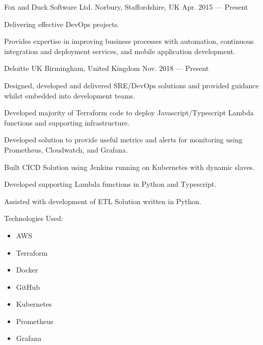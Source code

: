 

\begin{cventries}

	{Fox and Duck Software Ltd.} %
	{Norbury, Staffordshire, UK} %
	{Apr. 2015 — Present} %
	{
		\begin{cvitems} %
		\item {Delivering effective DevOps projects.}
		\item {Provides expertise in improving business processes with automation, continuous integration and deployment services, and mobile application development.}
		\end{cvitems}
	}

	{Deloitte UK}
	{Birmingham, United Kingdom}
	{Nov. 2018 — Present}
	{
		\begin{cvitems}
			\item{Designed, developed and delivered SRE/DevOps solutions and provided guidance whilst embedded into development teams.}
			\item{Developed majority of Terraform code to deploy Javascript/Typescript Lambda functions and supporting infrastructure.}
			\item{Developed solution to provide useful metrics and alerts for monitoring using Prometheus, Cloudwatch, and Grafana.}
			\item{Built CICD Solution using Jenkins running on Kubernetes with dynamic slaves.}
			\item{Developed supporting Lambda functions in Python and Typescript.}
			\item{Assisted with development of ETL Solution written in Python.}
			\item{Technologies Used:}
				\begin{itemize}
					\item AWS
					\item Terraform
					\item Docker
					\item GitHub
					\item Kubernetes
					\item Prometheus
					\item Grafana
				\end{itemize}
		\end{cvitems}
	}


\end{cventries}
